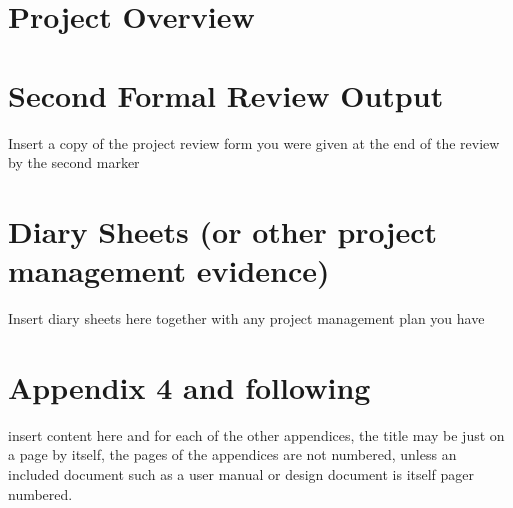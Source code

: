 \newpage
\begin{appendices}
	\section{Project Overview}
				
	\section{Second Formal Review Output}
		Insert a copy of the project review form you were given at the end of the review by the second marker
	
	\section{Diary Sheets (or other project management evidence)}
		Insert diary sheets here together with any project management plan you have
	
	\section{Appendix 4 and following}
		insert content here and for each of the other appendices, the title may be just on a page by itself, the pages of the appendices are not numbered, unless an included document such as a user manual or design document is itself pager numbered.
\end{appendices}
